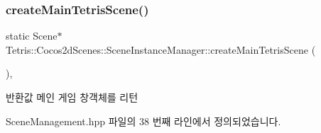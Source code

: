 \subsubsection{\texorpdfstring{create\+Main\+Tetris\+Scene()}{createMainTetrisScene()}}
{\footnotesize\ttfamily static Scene$\ast$ Tetris\+::\+Cocos2d\+Scenes\+::\+Scene\+Instance\+Manager\+::create\+Main\+Tetris\+Scene (\begin{DoxyParamCaption}{ }\end{DoxyParamCaption})\hspace{0.3cm}{\ttfamily [inline]}, {\ttfamily [static]}}

\begin{DoxyReturn}{반환값}
메인 게임 창객체를 리턴 
\end{DoxyReturn}


Scene\+Management.\+hpp 파일의 38 번째 라인에서 정의되었습니다.


